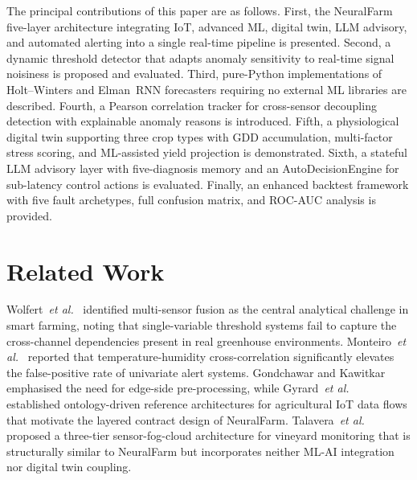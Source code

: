 \documentclass[journal,10pt,twocolumn]{IEEEtran}
\begin{document}
The principal contributions of this paper are as follows.
First, the NeuralFarm five-layer architecture integrating IoT,
advanced ML, digital twin, LLM advisory, and automated alerting into
a single real-time pipeline is presented.
Second, a dynamic threshold detector that adapts anomaly sensitivity
to real-time signal noisiness is proposed and evaluated.
Third, pure-Python implementations of Holt--Winters and Elman~RNN
forecasters requiring no external ML libraries are described.
Fourth, a Pearson correlation tracker for cross-sensor decoupling
detection with explainable anomaly reasons is introduced.
Fifth, a physiological digital twin supporting three crop types with
GDD accumulation, multi-factor stress scoring, and ML-assisted yield
projection is demonstrated.
Sixth, a stateful LLM advisory layer with five-diagnosis memory and
an AutoDecisionEngine for sub-latency control actions is evaluated.
Finally, an enhanced backtest framework with five fault archetypes,
full confusion matrix, and ROC-AUC analysis is provided.

\section{Related Work}
\label{sec:related}

Wolfert~\textit{et al.}~\cite{Wolfert2017} identified multi-sensor
fusion as the central analytical challenge in smart farming, noting
that single-variable threshold systems fail to capture the
cross-channel dependencies present in real greenhouse environments.
Monteiro~\textit{et al.}~\cite{Monteiro2018} reported that
temperature-humidity cross-correlation significantly elevates the
false-positive rate of univariate alert systems.
Gondchawar and Kawitkar~\cite{Gondchawar2016} emphasised the need for
edge-side pre-processing, while Gyrard~\textit{et al.}~\cite{Gyrard2018}
established ontology-driven reference architectures for agricultural
IoT data flows that motivate the layered contract design of NeuralFarm.
Talavera~\textit{et al.}~\cite{Talavera2017} proposed a three-tier
sensor-fog-cloud architecture for vineyard monitoring that is
structurally similar to NeuralFarm but incorporates neither ML-AI
integration nor digital twin coupling.
\end{document}

